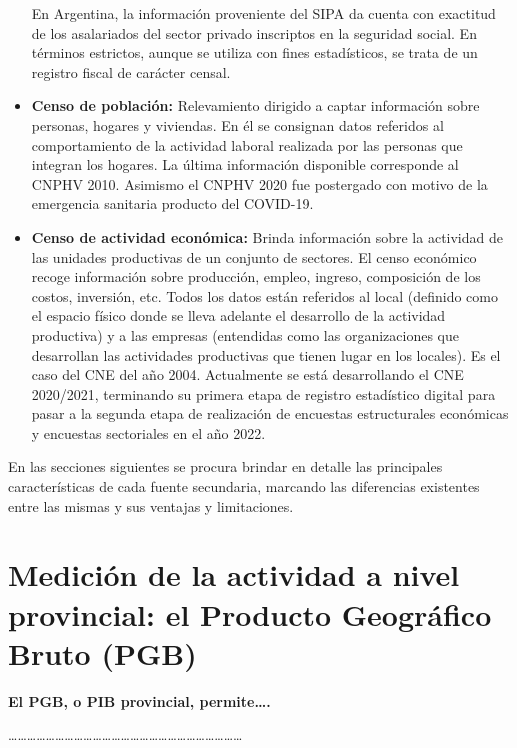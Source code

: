 \documentclass[
  openany]{book}
\begin{document}
\begin{itemize}
  En Argentina, la información proveniente del SIPA da cuenta con exactitud de los asalariados del sector privado inscriptos en la seguridad social.
  En términos estrictos, aunque se utiliza con fines estadísticos, se trata de un registro fiscal de carácter censal.
\item
  \textbf{Censo de población:} Relevamiento dirigido a captar información sobre personas, hogares y viviendas.
  En él se consignan datos referidos al comportamiento de la actividad laboral realizada por las personas que integran los hogares.
  La última información disponible corresponde al CNPHV 2010.
  Asimismo el CNPHV 2020 fue postergado con motivo de la emergencia sanitaria producto del COVID-19.
\item
  \textbf{Censo de actividad económica:} Brinda información sobre la actividad de las unidades productivas de un conjunto de sectores.
  El censo económico recoge información sobre producción, empleo, ingreso, composición de los costos, inversión, etc.
  Todos los datos están referidos al local (definido como el espacio físico donde se lleva adelante el desarrollo de la actividad productiva) y a las empresas (entendidas como las organizaciones que desarrollan las actividades productivas que tienen lugar en los locales).
  Es el caso del CNE del año 2004.
  Actualmente se está desarrollando el CNE 2020/2021, terminando su primera etapa de registro estadístico digital para pasar a la segunda etapa de realización de encuestas estructurales económicas y encuestas sectoriales en el año 2022.
\end{itemize}

En las secciones siguientes se procura brindar en detalle las principales características de cada fuente secundaria, marcando las diferencias existentes entre las mismas y sus ventajas y limitaciones.

\hypertarget{mediciuxf3n-de-la-actividad-a-nivel-provincial-el-producto-geogruxe1fico-bruto-pgb}{%
\section{Medición de la actividad a nivel provincial: el Producto Geográfico Bruto (PGB)}\label{mediciuxf3n-de-la-actividad-a-nivel-provincial-el-producto-geogruxe1fico-bruto-pgb}}

\textbf{El PGB, o PIB provincial, permite\ldots.}

\ldots\ldots\ldots\ldots\ldots\ldots\ldots\ldots\ldots\ldots\ldots\ldots\ldots\ldots\ldots\ldots\ldots\ldots\ldots\ldots\ldots\ldots\ldots\ldots\ldots{}
\end{document}
